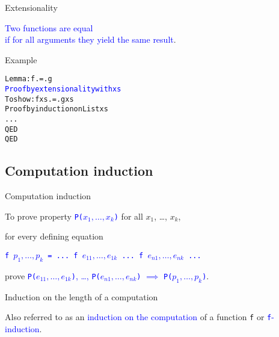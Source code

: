 \documentclass{beamer}
\def\code#1{\texttt{\frenchspacing#1}}
\begin{document}
\begin{frame}[fragile]{Extensionality}

\begin{center}
    \textcolor{blue}{Two functions are equal \\ if for all arguments they yield the same result}.
\end{center}

\pause

\vspace{0.5cm}
\begin{exampleblock}{Example}
\begin{alltt}
Lemma: f .=. g
\textcolor{blue}{Proof by extensionality with xs}
  To show: f xs .=. g xs
  Proof by induction on List xs
    ...
  QED
QED
\end{alltt}
\end{exampleblock}

\end{frame}

\subsection{Computation induction}

\begin{frame}{Computation induction}

To prove property \textcolor{blue}{\code{P($x_1, \dots, x_k$)}} for all $x_1$, \dots, $x_k$, \par
for every defining equation

\begin{center}
\textcolor{blue}{\code{f $p_1, \dots, p_k$ = ... f $e_{11}, \dots, e_{1k}$ ... f $e_{n1}, \dots, e_{nk}$ ...}}
\end{center}

prove \textcolor{blue}{\code{P($e_{11}, \dots, e_{1k}$)}, \dots, \code{P($e_{n1}, \dots, e_{nk}$)} $\implies$ \code{P($p_1, \dots, p_k$)}}.

\pause

\vspace{1cm}
\begin{block}{\centering Induction on the length of a computation}
\end{block}

\pause

Also referred to as an \textcolor{blue}{induction on the computation} of a function \code{f} or \textcolor{blue}{\code{f}-induction}.

\end{frame}
\end{document}
